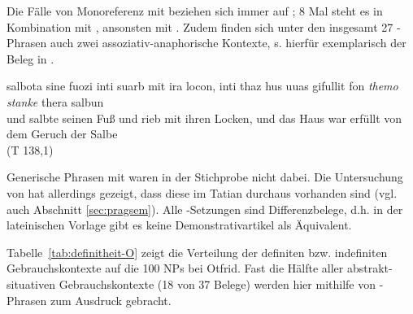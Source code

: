 
 Die Fälle von Monoreferenz mit  beziehen sich immer auf ; 8 Mal steht es in Kombination mit , ansonsten mit . Zudem finden sich unter den insgesamt 27 -Phrasen auch zwei assoziativ-anaphorische Kontexte, s. hierfür exemplarisch der Beleg in . 

%

\begin{exe}
\ex \label{ex:T27561}  {salbota} {sine} {fuozi} {inti} {suarb} {mit} {ira} {locon}, {inti} {thaz} {hus} {uuas} {gifullit} {fon} {\textit{themo}} {\textit{stanke}} {thera} {salbun}  \\
{und} {salbte} {seinen } {Fuß} {und} {rieb} {mit} {ihren} {Locken}, {und} {das} {Haus} {war} {erfüllt} {von} {dem} {Geruch} {der} {Salbe} \\
\glt {} (T 138,1)
\end{exe}

Generische Phrasen mit  waren in der Stichprobe nicht dabei. Die Untersuchung von \textcite{Oubouzar1989,Oubouzar1992} hat allerdings gezeigt, dass diese im Tatian durchaus vorhanden sind (vgl. auch Abschnitt \ref{sec:pragsem}). Alle -Setzungen sind Differenzbelege, d.h. in der lateinischen Vorlage gibt es keine Demonstrativartikel als Äquivalent.


Tabelle~\ref{tab:definitheit-O} zeigt die Verteilung der definiten bzw. indefiniten Gebrauchskontexte auf die 100 NPs bei Otfrid. Fast die Hälfte aller abstrakt-situativen Gebrauchskontexte (18 von 37 Belege) werden hier mithilfe von -Phrasen zum Ausdruck gebracht.

